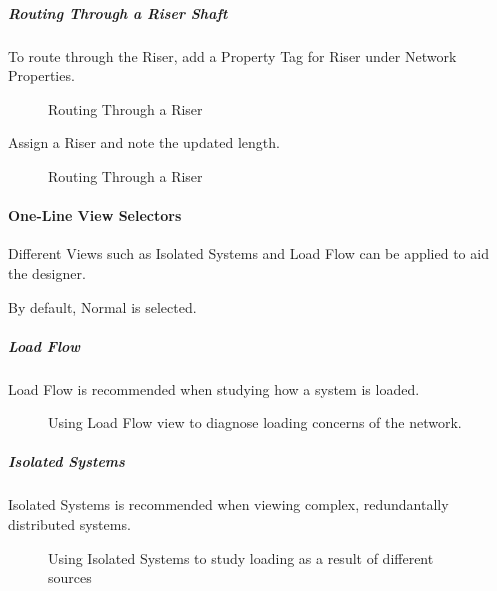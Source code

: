 \documentclass[letterpaper,10pt,english]{sphinxmanual}
\begin{document}
\subparagraph{Routing Through a Riser Shaft}
\label{\detokenize{docs/userguide/buildingelectricalmodel/one-line/index-one-line:routing-through-a-riser-shaft}}
To route through the Riser, add a Property Tag for Riser under Network Properties.

\begin{figure}[H]
\centering
\capstart

\noindent{}
\caption{Routing Through a Riser}\label{\detokenize{docs/userguide/buildingelectricalmodel/one-line/index-one-line:id23}}\end{figure}

Assign a Riser and note the updated length.

\begin{figure}[H]
\centering
\capstart

\noindent{}
\caption{Routing Through a Riser}\label{\detokenize{docs/userguide/buildingelectricalmodel/one-line/index-one-line:id24}}\end{figure}


\paragraph{One-Line View Selectors}
\label{\detokenize{docs/userguide/buildingelectricalmodel/one-line/index-one-line:one-line-view-selectors}}
Different Views such as Isolated Systems and Load Flow can be applied to aid the designer.

By default, Normal is selected.


\subparagraph{Load Flow}
\label{\detokenize{docs/userguide/buildingelectricalmodel/one-line/index-one-line:load-flow}}
Load Flow is recommended when studying how a system is loaded.

\begin{figure}[H]
\centering
\capstart

\noindent{}
\caption{Using Load Flow view to diagnose loading concerns of the network.}\label{\detokenize{docs/userguide/buildingelectricalmodel/one-line/index-one-line:id25}}\end{figure}


\subparagraph{Isolated Systems}
\label{\detokenize{docs/userguide/buildingelectricalmodel/one-line/index-one-line:isolated-systems}}
Isolated Systems is recommended when viewing complex, redundantally distributed systems.

\begin{figure}[H]
\centering
\capstart

\noindent{}
\caption{Using Isolated Systems to study loading as a result of different sources}\label{\detokenize{docs/userguide/buildingelectricalmodel/one-line/index-one-line:id26}}\end{figure}
\end{document}
